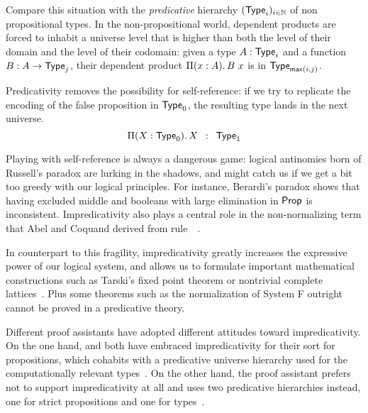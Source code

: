 Compare this situation with the \emph{predicative} hierarchy 
$(\varType_i)_{i \in \Nat}$ 
% 
% 
of non propositional types.
In the non-propositional world, dependent products are forced to inhabit a 
universe level that is higher than both the level of their domain and the level
of their codomain:
% 
given a type \( A : \varType_i \) and a function \( {\tm{B}{A \to \varType_j}} \), 
their dependent product \( \Depfun{A}{B\ x} \) is in 
\( \varType_{\mathsf{max}(i,j)} \).
 
Predicativity removes the possibility for self-reference: if we try to 
replicate the encoding of the false proposition in \( \varType_0 \), the
resulting type lands in the next universe.
\[
\Depfun[X]{\varType_0}{X} \enskip : \enskip \varType_1
\]

Playing with self-reference is always a dangerous game: 
logical antinomies born of Russell's paradox are lurking in the shadows, and 
might catch us if we get a bit too greedy with our logical principles. 
% 
For instance, Berardi's paradox shows that having excluded middle and booleans
with large elimination in \( \varProp \) is inconsistent.
% 
Impredicativity also plays a central role in the non-normalizing term
that Abel and Coquand derived from rule~~.

In counterpart to this fragility, impredicativity greatly increases the
expressive power of our logical system, and allows us to formulate important 
mathematical constructions such as Tarski's fixed point theorem or nontrivial 
complete lattices~.
% 
Plus some theorems such as the normalization of System F outright cannot be 
proved in a predicative theory.

Different proof assistants have adopted different attitudes toward 
impredicativity.
% 
On the one hand,
% 
% 
\Coq and \Lean both have embraced impredicativity for their sort for propositions, 
which cohabits with a predicative universe hierarchy used for the computationally 
relevant types~.
%
On the other hand, the \Agda proof assistant prefers not to support impredicativity 
at all and uses two predicative hierarchies instead, 
one for strict propositions and one for types~.

